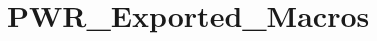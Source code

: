 \hypertarget{group___p_w_r___exported___macros}{}\section{P\+W\+R\+\_\+\+Exported\+\_\+\+Macros}
\label{group___p_w_r___exported___macros}

